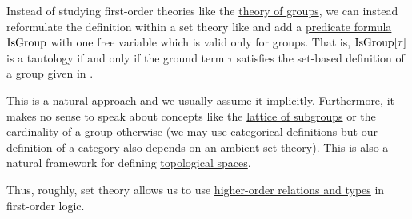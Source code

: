 \begin{remark}\label{rem:first_order_theories_in_zfc}
  Instead of studying first-order theories like the \hyperref[def:group/theory]{theory of groups}, we can instead reformulate the definition within a set theory like \hyperref[def:zfc]{} and add a \hyperref[rem:predicate_formula]{predicate formula} \( \operatorname{IsGroup} \) with one free variable which is valid only for groups. That is, \( \operatorname{IsGroup}[\tau] \) is a tautology if and only if the ground term \( \tau \) satisfies the set-based definition of a group given in .

  This is a natural approach and we usually assume it implicitly. Furthermore, it makes no sense to speak about concepts like the \hyperref[thm:substructures_form_complete_lattice]{lattice of subgroups} or the \hyperref[def:cardinal]{cardinality} of a group otherwise (we may use categorical definitions but our \hyperref[def:category]{definition of a category} also depends on an ambient set theory). This is also a natural framework for defining \hyperref[def:topological_space]{topological spaces}.

  Thus, roughly, set theory allows us to use \hyperref[rem:higher_order_logic]{higher-order relations and types} in first-order logic.
\end{remark}
